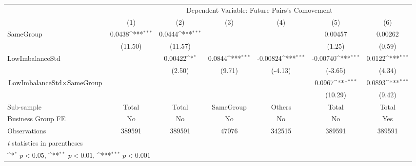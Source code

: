 {
\def\sym#1{\ifmmode^{#1}\else\(^{#1}\)\fi}
\begin{tabular}{l*{6}{c}}
\hline\hline
                    &\multicolumn{6}{c}{Dependent Variable:  Future Pairs's Comovement}                                                                 \\\cmidrule(lr){2-7}
                    &\multicolumn{1}{c}{(1)}         &\multicolumn{1}{c}{(2)}         &\multicolumn{1}{c}{(3)}         &\multicolumn{1}{c}{(4)}         &\multicolumn{1}{c}{(5)}         &\multicolumn{1}{c}{(6)}         \\
\hline
SameGroup           &      0.0438\sym{***}&      0.0444\sym{***}&                     &                     &     0.00457         &     0.00262         \\
                    &     (11.50)         &     (11.57)         &                     &                     &      (1.25)         &      (0.59)         \\
[1em]
LowImbalanceStd     &                     &     0.00422\sym{*}  &      0.0844\sym{***}&    -0.00824\sym{***}&    -0.00740\sym{***}&      0.0122\sym{***}\\
                    &                     &      (2.50)         &      (9.71)         &     (-4.13)         &     (-3.65)         &      (4.34)         \\
[1em]
 $ \text{LowImbalanceStd} \times {\text{SameGroup} } $ &                     &                     &                     &                     &      0.0967\sym{***}&      0.0893\sym{***}\\
                    &                     &                     &                     &                     &     (10.29)         &      (9.42)         \\
\hline
Sub-sample          &       Total         &       Total         &   SameGroup         &      Others         &       Total         &       Total         \\
Business Group FE   &          No         &          No         &          No         &          No         &          No         &         Yes         \\
Observations        &      389591         &      389591         &       47076         &      342515         &      389591         &      389591         \\
\hline\hline
\multicolumn{7}{l}{\footnotesize \textit{t} statistics in parentheses}\\
\multicolumn{7}{l}{\footnotesize \sym{*} \(p<0.05\), \sym{**} \(p<0.01\), \sym{***} \(p<0.001\)}\\
\end{tabular}
}
